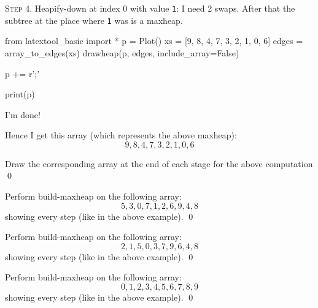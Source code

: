 \textsc{Step 4.}
Heapify-down at index 0 with value \texttt{1}:
I need 2 swaps.
After that the subtree at the place
where \texttt{1} was is a maxheap.

\begin{python}
from latextool_basic import *
p = Plot()
xs = [9, 8, 4, 7, 3, 2, 1, 0, 6]
edges = array_to_edges(xs)
drawheap(p, edges, include_array=False)

p += r'\node [ellipse, draw=red, fit=(9) (8) (4) (7) (3) (2) (1) (0) (6), line width=0.1cm, inner sep=0.0cm] {};'

print(p)
\end{python}

I'm done!

Hence I get this array (which represents the above maxheap):
\[
9,8,4,7,3,2,1,0,6
\]


\newpage
\begin{ex}
Draw the corresponding array at the end of each stage
for the above computation
\qed
\end{ex}


\newpage
\begin{ex}
Perform build-maxheap on the following array:
\[
5,3,0,7,1,2,6,9,4,8
\]
showing every step (like in the above example).
\qed
\end{ex}


\newpage
\begin{ex}
Perform build-maxheap on the following array:
\[
2,1,5,0,3,7,9,6,4,8
\]
showing every step (like in the above example).
\qed
\end{ex}


\newpage
\begin{ex}
Perform build-maxheap on the following array:
\[
0,1,2,3,4,5,6,7,8,9
\]
showing every step (like in the above example).
\qed
\end{ex}


